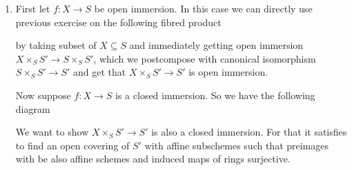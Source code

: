\begin{exercise}{2}
    \begin{enumerate}
        \item{
            First let $f \colon X \rightarrow S$ be open immersion. In this case
            we can directly use previous exercise on the following fibred
            product
                      
        \begin{center}
        \end{center}
        
            by taking subset of $X \subseteq S$ and immediately getting open
            immersion $X \times_S S' \rightarrow S \times_S S'$, which we
            postcompose with canonical isomorphism $S \times_S S' \rightarrow
            S'$ and get that $X \times_S S' \rightarrow S'$ is open immersion.

            Now suppose $f \colon X \rightarrow S$ is a closed immersion. So we
            have the following diagram

            \begin{center}
            \end{center}

            We want to show $X \times_S S' \rightarrow S'$ is also a closed
            immersion. For that it satisfies to find an open covering of $S'$
            with affine subschemes such that preimages with be also affine schemes
            and induced maps of rings surjective.

}
\end{enumerate}
\end{exercise}
